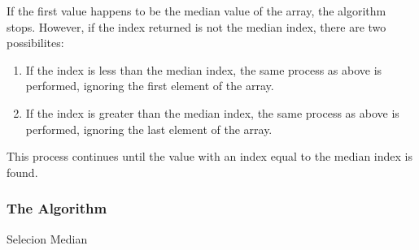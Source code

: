 \documentclass{article}
\begin{document}
        If the first value happens to be the median value of the array, the algorithm stops. However, if the index returned is not the median index, there are two possibilites:

        \begin{enumerate}
            \item If the index is less than the median index, the same process as above is performed, ignoring the first element of the array.
            \item If the index is greater than the median index, the same process as above is performed, ignoring the last element of the array.
        \end{enumerate}

        This process continues until the value with an index equal to the median index is found.

        \subsubsection{The Algorithm}
            \begin{algorithm}[H]
                \caption{Selecion Median}
                \begin{algorithmic}[1]
                    \Function{Median}{$A[0..n - 1$}
                        \Else
                        \EndIf
                    \EndFunction\\

                        \EndIf
                        \EndIf
                        \EndIf
                    \EndFunction\\


                            \EndIf
                        \EndFor
                    \EndFunction
                \end{algorithmic}
            \end{algorithm}
\end{document}
